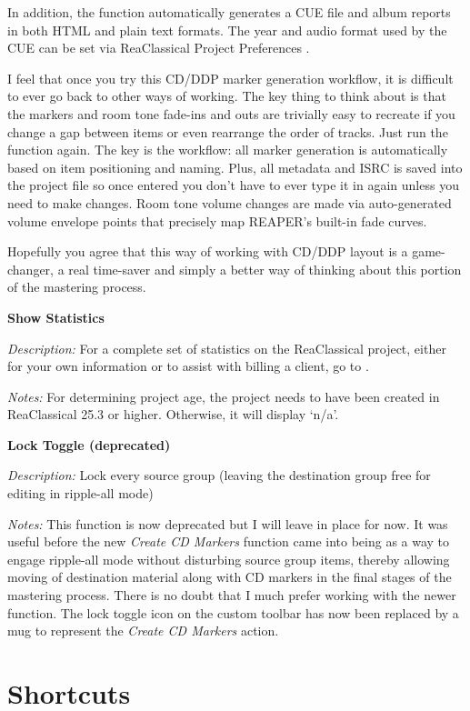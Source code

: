 \documentclass[10pt,american]{article}
\begin{document}
In addition, the function automatically generates a CUE file and album reports
in both HTML and plain text formats. The year and audio format used by the CUE
can be set via ReaClassical Project Preferences .

I feel that once you try this CD/DDP marker generation workflow, it is difficult
to ever go back to other ways of working. The key thing to think about is that
the markers and room tone fade-ins and outs are trivially easy to recreate if
you change a gap between items or even rearrange the order of tracks. Just run
the function again. The key is the workflow: all marker generation is
automatically based on item positioning and naming. Plus, all metadata and ISRC
is saved into the project file so once entered you don't have to ever type it in
again unless you need to make changes. Room tone volume changes are made via
auto-generated volume envelope points that precisely map REAPER's built-in fade
curves.

Hopefully you agree that this way of working with CD/DDP layout is a
game-changer, a real time-saver and simply a better way of thinking about this
portion of the mastering process.

\textbf{Show Statistics} 

\emph{Description:} For a complete set of statistics on the ReaClassical
project, either for your own information or to assist with billing a client, go
to . 

\emph{Notes:} For determining project age, the project needs to have been
created in ReaClassical 25.3 or higher. Otherwise, it will display `n/a'.

\textbf{Lock Toggle (deprecated)}

\emph{Description: }Lock every source group (leaving the destination group free
for editing in ripple-all mode)

\emph{Notes:} This function is now deprecated but I will leave in place for now.
It was useful before the new \emph{Create CD Markers} function came into being
as a way to engage ripple-all mode without disturbing source group items,
thereby allowing moving of destination material along with CD markers in the
final stages of the mastering process. There is no doubt that I much prefer
working with the newer function. The lock toggle icon on the custom toolbar has
now been replaced by a mug to represent the \emph{Create CD Markers}
action.\pagebreak{}

\section{Shortcuts}
\end{document}

